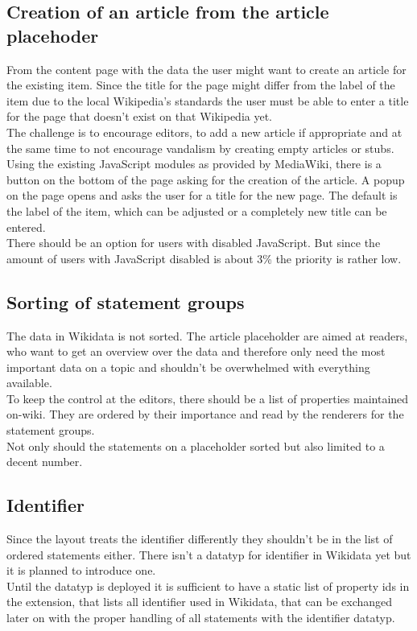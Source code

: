 \documentclass[11pt]{article}
\begin{document}
\subsection{Creation of an article from the article placehoder}
From the content page with the data the user might want to create an article for the existing item. Since the title for the page might differ from the label of the item due to the local Wikipedia's standards the user must be able to enter a title for the page that doesn't exist on that Wikipedia yet. \\
The challenge is to encourage editors, to add a new article if appropriate and at the same time to not encourage vandalism by creating empty articles or stubs.\\
Using the existing JavaScript modules as provided by MediaWiki, there is a button on the bottom of the page asking for the creation of the article. A popup on the page opens and asks the user for a title for the new page. The default is the label of the item, which can be adjusted or a completely new title can be entered. \\
There should be an option for users with disabled JavaScript. But since the amount of users with JavaScript disabled is about 3\% %
the priority is rather low. \\

\subsection{Sorting of statement groups}
The data in Wikidata is not sorted. The article placeholder are aimed at readers, who want to get an overview over the data and therefore only need the most important data on a topic and shouldn't be overwhelmed with everything available. 
\\
To keep the control at the editors, there should be a list of properties maintained on-wiki. They are ordered by their importance and read by the renderers for the statement groups. \\
Not only should the statements on a placeholder sorted but also limited to a decent number.

\subsection {Identifier}
Since the layout treats the identifier differently they shouldn't be in the list of ordered statements either. There isn't a datatyp for identifier in Wikidata yet but it is planned to introduce one. \\
Until the datatyp is deployed it is sufficient to have a static list of property ids in the extension, that lists all identifier used in Wikidata, that can be exchanged later on with the proper handling of all statements with the identifier datatyp.
\end{document}
